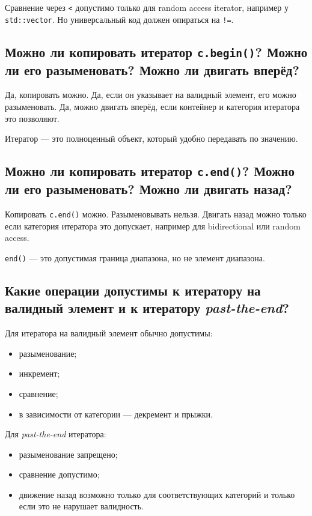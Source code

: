 \begin{remark}
Сравнение через \texttt{<} допустимо только для random access iterator, например у \texttt{std::vector}. Но универсальный код должен опираться на \texttt{!=}.
\end{remark}

\subsection{Можно ли копировать итератор \texttt{c.begin()}? Можно ли его разыменовать? Можно ли двигать вперёд?}
Да, копировать можно.  
Да, если он указывает на валидный элемент, его можно разыменовать.  
Да, можно двигать вперёд, если контейнер и категория итератора это позволяют.

\begin{remark}
Итератор — это полноценный объект, который удобно передавать по значению.
\end{remark}

\subsection{Можно ли копировать итератор \texttt{c.end()}? Можно ли его разыменовать? Можно ли двигать назад?}
Копировать \texttt{c.end()} можно.  
Разыменовывать нельзя.  
Двигать назад можно только если категория итератора это допускает, например для bidirectional или random access.

\begin{remark}
\texttt{end()} — это допустимая граница диапазона, но не элемент диапазона.
\end{remark}

\subsection{Какие операции допустимы к итератору на валидный элемент и к итератору \textit{past-the-end}?}
Для итератора на валидный элемент обычно допустимы:
\begin{itemize}
    \item разыменование;
    \item инкремент;
    \item сравнение;
    \item в зависимости от категории — декремент и прыжки.
\end{itemize}

Для \textit{past-the-end} итератора:
\begin{itemize}
    \item разыменование запрещено;
    \item сравнение допустимо;
    \item движение назад возможно только для соответствующих категорий и только если это не нарушает валидность.
\end{itemize}


